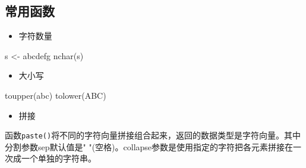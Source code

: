 \documentclass[
]{book}
\newenvironment{Shaded}{\begin{snugshade}}{\end{snugshade}}
\newcommand{\FunctionTok}[1]{\textcolor[rgb]{0.00,0.00,0.00}{#1}}
\newcommand{\NormalTok}[1]{#1}
\newcommand{\OtherTok}[1]{\textcolor[rgb]{0.56,0.35,0.01}{#1}}
\newcommand{\StringTok}[1]{\textcolor[rgb]{0.31,0.60,0.02}{#1}}
\providecommand{\tightlist}{%
  \setlength{\itemsep}{0pt}\setlength{\parskip}{0pt}}
\begin{document}
\hypertarget{ux5e38ux7528ux51fdux6570-1}{%
\subsection{常用函数}\label{ux5e38ux7528ux51fdux6570-1}}

\begin{itemize}
\tightlist
\item
  字符数量
\end{itemize}

\begin{Shaded}
\begin{Highlighting}[]
\NormalTok{s }\OtherTok{\textless{}{-}} \StringTok{\textquotesingle{}abcdefg\textquotesingle{}}
\FunctionTok{nchar}\NormalTok{(s)}
\end{Highlighting}
\end{Shaded}

\begin{itemize}
\tightlist
\item
  大小写
\end{itemize}

\begin{Shaded}
\begin{Highlighting}[]
\FunctionTok{toupper}\NormalTok{(}\StringTok{\textquotesingle{}abc\textquotesingle{}}\NormalTok{)}
\FunctionTok{tolower}\NormalTok{(}\StringTok{\textquotesingle{}ABC\textquotesingle{}}\NormalTok{)}
\end{Highlighting}
\end{Shaded}

\begin{itemize}
\tightlist
\item
  拼接
\end{itemize}

函数\texttt{paste()}将不同的字符向量拼接组合起来，返回的数据类型是字符向量。其中分割参数sep默认值是" "(空格)。collapse参数是使用指定的字符把各元素拼接在一次成一个单独的字符串。
\end{document}

